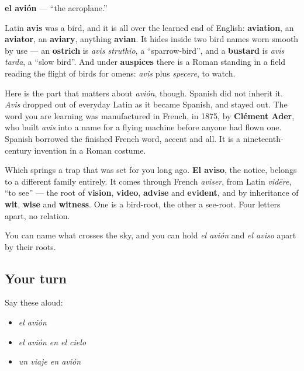 \begin{cousinweb}
\textbf{el avión} — \textquotedblleft{}the aeroplane.\textquotedblright{}

Latin \textbf{avis} was a bird, and it is all over the learned end of English: \textbf{aviation}, an \textbf{aviator}, an \textbf{aviary}, anything \textbf{avian}. It hides inside two bird names worn smooth by use — an \textbf{ostrich} is \emph{avis struthio}, a \textquotedblleft{}sparrow-bird\textquotedblright{}, and a \textbf{bustard} is \emph{avis tarda}, a \textquotedblleft{}slow bird\textquotedblright{}. And under \textbf{auspices} there is a Roman standing in a field reading the flight of birds for omens: \emph{avis} plus \emph{specere}, to watch.

Here is the part that matters about \emph{avión}, though. Spanish did not inherit it. \emph{Avis} dropped out of everyday Latin as it became Spanish, and stayed out. The word you are learning was manufactured in French, in 1875, by \textbf{Clément Ader}, who built \emph{avis} into a name for a flying machine before anyone had flown one. Spanish borrowed the finished French word, accent and all. It is a nineteenth-century invention in a Roman costume.

Which springs a trap that was set for you long ago. \textbf{El aviso}, the notice, belongs to a different family entirely. It comes through French \emph{aviser}, from Latin \emph{vidēre}, \textquotedblleft{}to see\textquotedblright{} — the root of \textbf{vision}, \textbf{video}, \textbf{advise} and \textbf{evident}, and by inheritance of \textbf{wit}, \textbf{wise} and \textbf{witness}. One is a bird-root, the other a see-root. Four letters apart, no relation.
\end{cousinweb}

\begin{grammarlens}[title={What you've built}]
You can name what crosses the sky, and you can hold \emph{el avión} and \emph{el aviso} apart by their roots.
\end{grammarlens}

\subsection*{Your turn}
Say these aloud:

\begin{itemize}
\raggedright
  \item \emph{el avión}
  \item \emph{el avión en el cielo}
  \item \emph{un viaje en avión}
\end{itemize}

